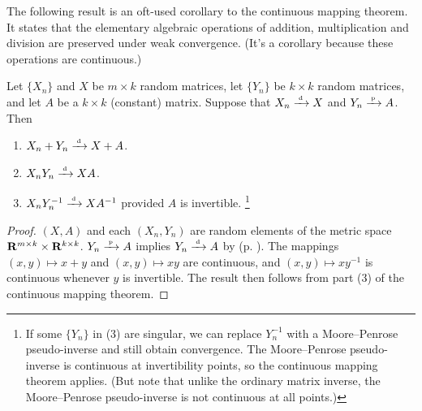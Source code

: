 \documentclass[11pt,letterpaper,reqno,oneside]{article}
\begin{document}
The following result is an oft-used corollary to the continuous mapping theorem. It states that the elementary algebraic operations of addition, multiplication and division are preserved under weak convergence. (It's a corollary because these operations are continuous.)
%
\begin{corollary}
	\label{corollary:Slutsky}
	Let $\{ X_n \}$ and $X$ be $m\times k$ random matrices, let $\{ Y_n \}$ be $k \times k$ random matrices, and let $A$ be a $k \times k$ (constant) matrix. Suppose that $X_n \xrightarrow{{\scriptscriptstyle \mathrm{\;d\;}}} X$ and $Y_n \xrightarrow{{\scriptscriptstyle \mathrm{\;p\;}}} A$. Then
	\begin{enumerate}

		\item $X_n + Y_n \xrightarrow{{\scriptscriptstyle \mathrm{\;d\;}}} X + A$.

		\item $X_n Y_n \xrightarrow{{\scriptscriptstyle \mathrm{\;d\;}}} X A$.

		\item $X_n Y_n^{-1} \xrightarrow{{\scriptscriptstyle \mathrm{\;d\;}}} X A^{-1}$ provided $A$ is invertible.%
			\footnote{If some $\{ Y_n \}$ in (3) are singular, we can replace $Y_n^{-1}$ with a Moore--Penrose pseudo-inverse and still obtain convergence. The Moore--Penrose pseudo-inverse is continuous at invertibility points, so the continuous mapping theorem applies. (But note that unlike the ordinary matrix inverse, the Moore--Penrose pseudo-inverse is not continuous at all points.)}

	\end{enumerate}
\end{corollary}


\begin{proof}
	$(X,A)$ and each $(X_n,Y_n)$ are random elements of the metric space $\mathbf{R}^{m \times k} \times \mathbf{R}^{k \times k}$. $Y_n \xrightarrow{{\scriptscriptstyle \mathrm{\;p\;}}} A$ implies $Y_n \xrightarrow{{\scriptscriptstyle \mathrm{\;d\;}}} A$ by  (p. \pageref{proposition:convd_convp}). The mappings $(x,y) \mapsto x+y$ and $(x,y) \mapsto xy$ are continuous, and $(x,y) \mapsto xy^{-1}$ is continuous whenever $y$ is invertible. The result then follows from part (3) of the continuous mapping theorem.
\end{proof}

\end{document}
